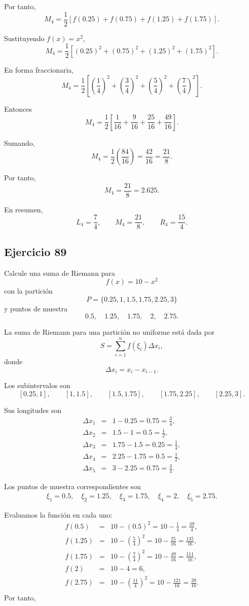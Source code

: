 \documentclass[12pt]{article}
\begin{document}
Por tanto,
\[
M_4
=
\frac12
\left[
f(0.25)+f(0.75)+f(1.25)+f(1.75)
\right].
\]

Sustituyendo \(f(x)=x^2\),
\[
M_4
=
\frac12
\left[
(0.25)^2+(0.75)^2+(1.25)^2+(1.75)^2
\right].
\]

En forma fraccionaria,
\[
M_4
=
\frac12
\left[
\left(\frac14\right)^2+
\left(\frac34\right)^2+
\left(\frac54\right)^2+
\left(\frac74\right)^2
\right].
\]

Entonces
\[
M_4
=
\frac12
\left[
\frac1{16}+\frac9{16}+\frac{25}{16}+\frac{49}{16}
\right].
\]

Sumando,
\[
M_4
=
\frac12
\left(
\frac{84}{16}
\right)
=
\frac{42}{16}
=
\frac{21}{8}.
\]

Por tanto,
\[
\boxed{M_4=\frac{21}{8}=2.625}.
\]

En resumen,
\[
\boxed{
L_4=\frac74,\qquad
M_4=\frac{21}{8},\qquad
R_4=\frac{15}{4}
}.
\]

\subsection*{Ejercicio 89}
Calcule una suma de Riemann para
\[
f(x)=10-x^2
\]
con la partición
\[
P=\{0.25,1,1.5,1.75,2.25,3\}
\]
y puntos de muestra
\[
0.5,\quad 1.25,\quad 1.75,\quad 2,\quad 2.75.
\]

La suma de Riemann para una partición no uniforme está dada por
\[
S=\sum_{i=1}^{n}f(\xi_i)\Delta x_i,
\]
donde
\[
\Delta x_i=x_i-x_{i-1}.
\]

Los subintervalos son
\[
[0.25,1],\qquad
[1,1.5],\qquad
[1.5,1.75],\qquad
[1.75,2.25],\qquad
[2.25,3].
\]

Sus longitudes son
\begin{eqnarray*}
\Delta x_1&=&1-0.25=0.75=\frac34,\\
\Delta x_2&=&1.5-1=0.5=\frac12,\\
\Delta x_3&=&1.75-1.5=0.25=\frac14,\\
\Delta x_4&=&2.25-1.75=0.5=\frac12,\\
\Delta x_5&=&3-2.25=0.75=\frac34.
\end{eqnarray*}

Los puntos de muestra correspondientes son
\begin{eqnarray*}
\xi_1=0.5,\quad
\xi_2=1.25,\quad
\xi_3=1.75,\quad
\xi_4=2,\quad
\xi_5=2.75.
\end{eqnarray*}

Evaluamos la función en cada uno:
\begin{eqnarray*}
f(0.5)&=&10-(0.5)^2=10-\frac14=\frac{39}{4},\\
f(1.25)&=&10-\left(\frac54\right)^2=10-\frac{25}{16}=\frac{135}{16},\\
f(1.75)&=&10-\left(\frac74\right)^2=10-\frac{49}{16}=\frac{111}{16},\\
f(2)&=&10-4=6,\\
f(2.75)&=&10-\left(\frac{11}{4}\right)^2=10-\frac{121}{16}=\frac{39}{16}.\\
\end{eqnarray*}
Por tanto,
\end{document}
